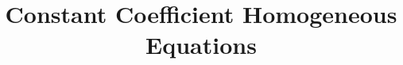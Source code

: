 \documentclass{ximera}
\title[Dig-In:]{Constant Coefficient Homogeneous Equations}
\begin{document}
\begin{abstract}
  
\end{abstract}
\maketitle
\end{document}
